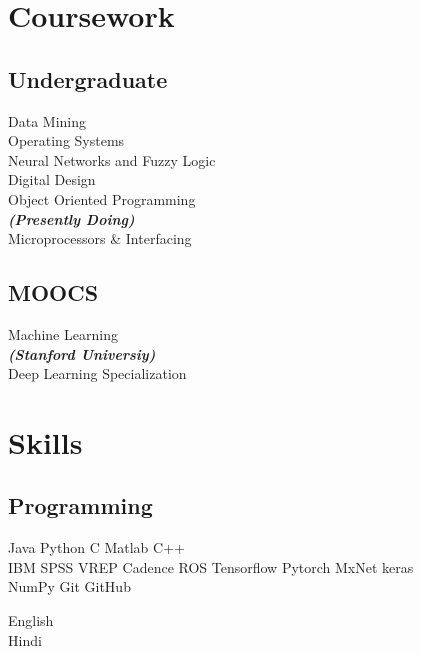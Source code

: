 \documentclass[]{limos-resume-openfont}
\begin{document}
\begin{minipage}[t]{0.33\textwidth}

\section{Coursework}

\subsection{Undergraduate}
Data Mining \\
Operating Systems \\
Neural Networks and Fuzzy Logic \\
Digital Design \\
Object Oriented Programming \\
{\footnotesize \textit{\textbf{(Presently Doing) }}} \\
Microprocessors \& Interfacing \\
\sectionsep
\subsection{MOOCS}
Machine Learning\\
{\footnotesize \textit{\textbf{(Stanford Universiy) }}} \\
Deep Learning Specialization\\



\section{Skills}
\subsection{Programming}
Java \textbullet{}  Python \textbullet{} C \textbullet{} Matlab \textbullet{} C++  \\ 
IBM SPSS \textbullet{} VREP \textbullet{}  Cadence \textbullet{}ROS
Tensorflow \textbullet{} Pytorch \textbullet{} MxNet \textbullet{} keras\\
NumPy \textbullet{} Git \textbullet{} GitHub\\
\sectionsep

English \textbullet{}\textbullet{}\textbullet{}\textbullet{}\\
Hindi  \textbullet{}\textbullet{}\textbullet{}\textbullet{}\textbullet{}



%
%

\end{minipage} 
\end{document}

